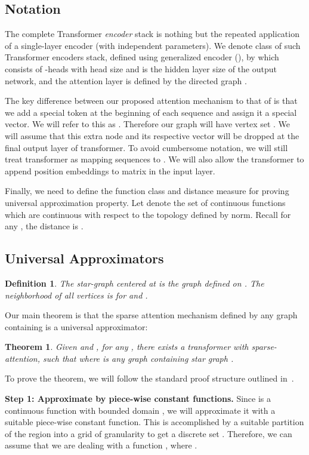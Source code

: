 \documentclass{article}
\newtheorem{theorem}{Theorem}
\newtheorem{definition}{Definition}
\begin{document}
\subsection{Notation}
The complete Transformer {\em encoder} stack is nothing but the repeated application of a single-layer encoder (with independent parameters). 
We denote class of such Transformer encoders stack, defined using  generalized encoder (),  by  which consists of -heads with head size  and  is the hidden layer size of the output network, and the attention layer is defined by the directed graph . 

The key difference between our proposed attention mechanism to that of \citet{vaswani2017attention,Yun19} is that we add a special token at the beginning of each sequence and assign it a special vector. 
We will refer to this as . 
Therefore our graph  will have vertex set .
We will assume that this extra node and its respective vector will be dropped at the final output layer of transformer. 
To avoid cumbersome notation, we will still treat transformer as mapping sequences 
 to . We will also allow the 
transformer to append position embeddings   to 
matrix  in the input layer. 

Finally, we need to define the function class and distance measure for proving universal approximation property. 
Let  denote the set of continuous functions  
which are continuous with respect to the topology defined by   norm. 
Recall for any  , the  distance is .

\subsection{Universal Approximators}
\begin{definition}
The star-graph  centered at  is the graph defined on . 
The neighborhood of all vertices  is   for  and 
. 
\end{definition} 
Our main theorem is that the sparse attention mechanism defined by any graph containing 
is a universal approximator:
\begin{theorem}
\label{thm:universal}
    Given  and , for any , there exists a 
    transformer with sparse-attention,   such that 
     where  is any graph containing star graph . 
\end{theorem}
To prove the theorem, we will follow the standard proof structure outlined in~\citep{Yun19}.

\textbf{Step 1: Approximate  by piece-wise constant functions.} 
    Since  is a continuous function with bounded domain , we will 
    approximate it with a  suitable piece-wise constant function. This is accomplished by a suitable partition of the  region  into a grid of granularity  to get a discrete set . Therefore, we can assume that we are dealing with a function 
    , where . 
    
\end{document}
